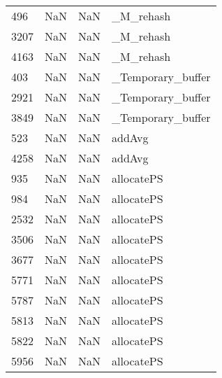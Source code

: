 \begin{tabular}{llll}
496  &                   NaN &                        NaN &                                 \_M\_rehash \\
3207 &                   NaN &                        NaN &                                 \_M\_rehash \\
4163 &                   NaN &                        NaN &                                 \_M\_rehash \\
403  &                   NaN &                        NaN &                         \_Temporary\_buffer \\
2921 &                   NaN &                        NaN &                         \_Temporary\_buffer \\
3849 &                   NaN &                        NaN &                         \_Temporary\_buffer \\
523  &                   NaN &                        NaN &                                    addAvg \\
4258 &                   NaN &                        NaN &                                    addAvg \\
935  &                   NaN &                        NaN &                                allocatePS \\
984  &                   NaN &                        NaN &                                allocatePS \\
2532 &                   NaN &                        NaN &                                allocatePS \\
3506 &                   NaN &                        NaN &                                allocatePS \\
3677 &                   NaN &                        NaN &                                allocatePS \\
5771 &                   NaN &                        NaN &                                allocatePS \\
5787 &                   NaN &                        NaN &                                allocatePS \\
5813 &                   NaN &                        NaN &                                allocatePS \\
5822 &                   NaN &                        NaN &                                allocatePS \\
5956 &                   NaN &                        NaN &                                allocatePS \\

\end{tabular}
